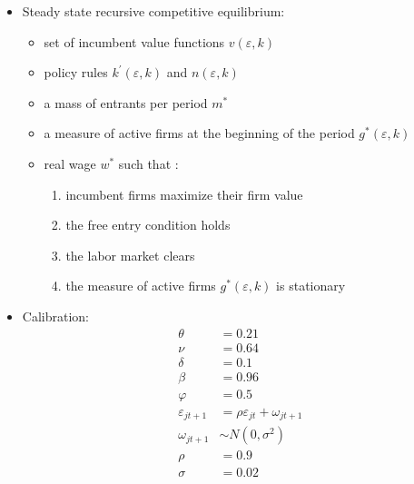 \documentclass[12pt]{article}
\begin{document}
\begin{itemize}
      \item Steady state recursive competitive equilibrium:
      \begin{itemize}
        \item set of incumbent value functions $v(\varepsilon, k)$
        \item policy rules $k^{\prime}(\varepsilon, k)$ and $n(\varepsilon, k)$
        \item a mass of entrants per period $m^*$
        \item a measure of active firms at the beginning of the period $g^{*}(\varepsilon, k)$
        \item real wage $w^*$ such that :
        \begin{enumerate}
          \item incumbent firms maximize their firm value
          \item the free entry condition holds
          \item the labor market clears
          \item the measure of active firms $g^{*}(\varepsilon, k)$ is stationary
        \end{enumerate}
      \end{itemize}

      \item Calibration:
      \begin{align*}
        \theta &= 0.21 \\
        \nu &= 0.64 \\
        \delta &= 0.1 \\
        \beta &= 0.96 \\
        \varphi &= 0.5 \\
        \varepsilon_{j t+1} &= \rho \varepsilon_{j t}+\omega_{j t+1} \\
        \omega_{j t+1} &\sim N\left(0, \sigma^{2}\right) \\
        \rho &= 0.9 \\
        \sigma &= 0.02 \\
      \end{align*}
    \end{itemize}
\end{document}
